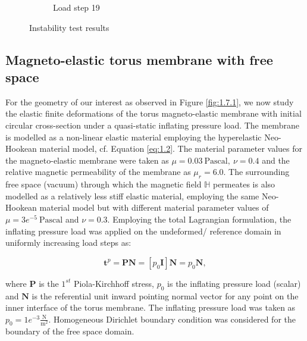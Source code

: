 \documentclass[11pt,a4paper,final]{article}
\begin{document}
\begin{figure}[ht!]
\begin{subfigure}[b]{0.49\textwidth}
\caption{Load step 19}
\label{fig:1.15.2}
\end{subfigure}
\caption{Instability test results}
\label{fig:1.15}
\end{figure}

\subsection{Magneto-elastic torus membrane with free space}
For the geometry of our interest as observed in Figure \eqref{fig:1.7.1}, we now study the elastic finite deformations of the torus magneto-elastic membrane with initial circular cross-section under a quasi-static inflating pressure load. The membrane is modelled as a non-linear elastic material employing the hyperelastic Neo-Hookean material model, cf. Equation \eqref{eq:1.2}. The material parameter values for the magneto-elastic membrane were taken as $\mu = 0.03 \ \text{Pascal}, \ \nu = 0.4$ and the relative magnetic permeability of the membrane as $\mu_r = 6.0$. The surrounding free space (vacuum) through which the magnetic field $\mathbb{H}$ permeates is also modelled as a relatively less stiff elastic material, employing the same Neo-Hookean material model but with different material parameter values of $\mu = 3e^{-5} \ \text{Pascal}$ and $\nu = 0.3$. Employing the total Lagrangian formulation, the inflating pressure load was applied on the undeformed/ reference domain in uniformly increasing load steps as:

\begin{equation}
\mathbf{t}^p = \mathbf{P}\mathbf{N} = \left[ p_0 \mathbf{I} \right] \mathbf{N} = p_0 \mathbf{N},
\end{equation}

\noindent where $\mathbf{P}$ is the $1^{st}$ Piola-Kirchhoff stress, $p_0$ is the inflating pressure load (scalar) and $\mathbf{N}$ is the referential unit inward pointing normal vector for any point on the inner interface of the torus membrane. The inflating pressure load was taken as $p_0 = 1e^{-3} \frac{\text{N}}{\text{m}^2}$. Homogeneous Dirichlet boundary condition was considered for the boundary of the free space domain.\par 
\end{document}
